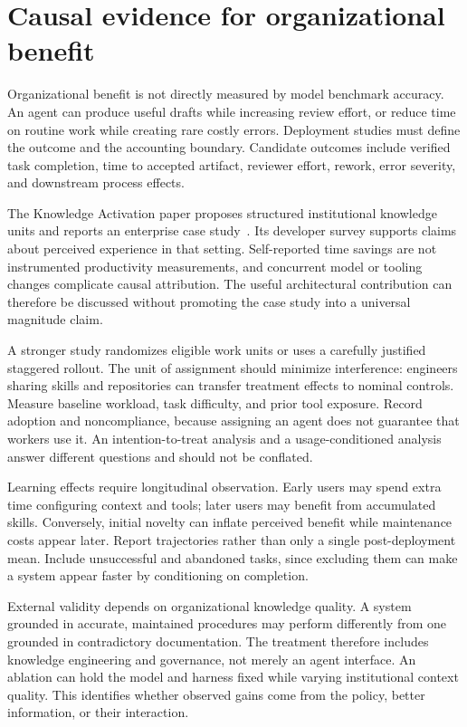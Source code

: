 \section{Causal evidence for organizational benefit}\label{sec:C24:benefit}
Organizational benefit is not directly measured by model benchmark accuracy. An agent can produce useful drafts while increasing review effort, or reduce time on routine work while creating rare costly errors. Deployment studies must define the outcome and the accounting boundary. Candidate outcomes include verified task completion, time to accepted artifact, reviewer effort, rework, error severity, and downstream process effects.

The Knowledge Activation paper proposes structured institutional knowledge units and reports an enterprise case study~\cite{corpus260314805}. Its developer survey supports claims about perceived experience in that setting. Self-reported time savings are not instrumented productivity measurements, and concurrent model or tooling changes complicate causal attribution. The useful architectural contribution can therefore be discussed without promoting the case study into a universal magnitude claim.

A stronger study randomizes eligible work units or uses a carefully justified staggered rollout. The unit of assignment should minimize interference: engineers sharing skills and repositories can transfer treatment effects to nominal controls. Measure baseline workload, task difficulty, and prior tool exposure. Record adoption and noncompliance, because assigning an agent does not guarantee that workers use it. An intention-to-treat analysis and a usage-conditioned analysis answer different questions and should not be conflated.

Learning effects require longitudinal observation. Early users may spend extra time configuring context and tools; later users may benefit from accumulated skills. Conversely, initial novelty can inflate perceived benefit while maintenance costs appear later. Report trajectories rather than only a single post-deployment mean. Include unsuccessful and abandoned tasks, since excluding them can make a system appear faster by conditioning on completion.

External validity depends on organizational knowledge quality. A system grounded in accurate, maintained procedures may perform differently from one grounded in contradictory documentation. The treatment therefore includes knowledge engineering and governance, not merely an agent interface. An ablation can hold the model and harness fixed while varying institutional context quality. This identifies whether observed gains come from the policy, better information, or their interaction.

